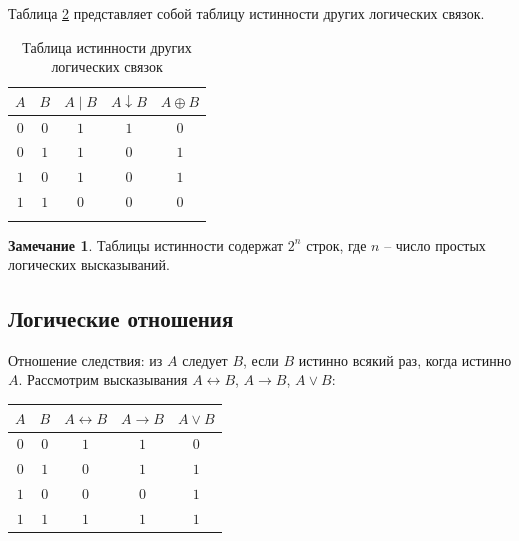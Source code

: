 \documentclass[a5paper, 11pt]{extarticle}
\theoremstyle{definition}
\theoremstyle{definition}
\theoremstyle{definition}
\newtheorem*{note*}{Замечание}
\numberwithin{figure}{section}
\numberwithin{table}{section}
\begin{document}
Таблица \ref{tab:truth-table-olc} представляет собой таблицу истинности других логических связок.

\begin{table}[H]
    \renewcommand*{\arraystretch}{1.5}
    \begin{longtable}{|c|c|c|c|c|}
        \hline
        \(A\) & \(B\) & \(A \mathop{|} B\) & \(A \downarrow B\) & \(A \oplus B\) \\
        \hline
        \(0\) & \(0\) & \(1\)              & \(1\)              & \(0\)          \\
        \hline
        \(0\) & \(1\) & \(1\)              & \(0\)              & \(1\)          \\
        \hline
        \(1\) & \(0\) & \(1\)              & \(0\)              & \(1\)          \\
        \hline
        \(1\) & \(1\) & \(0\)              & \(0\)              & \(0\)          \\
        \hline
        \caption{Таблица истинности других логических связок}
        \label{tab:truth-table-olc}
    \end{longtable}
\end{table}

\begin{note*}
    Таблицы истинности содержат \(2^n\) строк, где \(n\) -- число простых логических высказываний.
\end{note*}

\subsection{Логические отношения}

Отношение следствия: из \(A\) следует \(B\), если \(B\) истинно всякий раз, когда истинно \(A\). Рассмотрим высказывания \(A \leftrightarrow B\), \(A \to B\), \(A \lor B\):
\begin{table}[H]
    \renewcommand*{\arraystretch}{1.5}
    \begin{longtable}{|c|c|c|c|c|}
        \hline
        \(A\) & \(B\) & \(A \leftrightarrow B\) & \(A \to B\) & \(A \lor B\) \\
        \hline
        \(0\) & \(0\) & \(1\)                   & \(1\)       & \(0\)        \\
        \hline
        \(0\) & \(1\) & \(0\)                   & \(1\)       & \(1\)        \\
        \hline
        \(1\) & \(0\) & \(0\)                   & \(0\)       & \(1\)        \\
        \hline
        \(1\) & \(1\) & \(1\)                   & \(1\)       & \(1\)        \\
        \hline
    \end{longtable}
\end{table}
\end{document}
